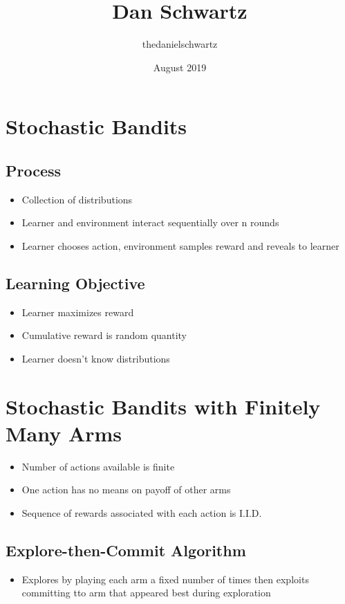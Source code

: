 \documentclass{article}
\title{Dan Schwartz}
\author{thedanielschwartz }
\date{August 2019}
\begin{document}
\maketitle

\section{Stochastic Bandits}
\subsection{Process}
\begin{itemize}
	\item Collection of distributions
	\item Learner and environment interact sequentially over n rounds
	\item Learner chooses action, environment samples reward and reveals to learner
\end{itemize}
\subsection{Learning Objective}
\begin{itemize}
	\item Learner maximizes reward
	\item Cumulative reward is random quantity
	\item Learner doesn't know distributions
\end{itemize}

\section{Stochastic Bandits with Finitely Many Arms}
\begin{itemize}
	\item Number of actions available is finite
	\item One action has no means on payoff of other arms
	\item Sequence of rewards associated with each action is I.I.D.
\end{itemize}
\subsection{Explore-then-Commit Algorithm}
\begin{itemize}
	\item Explores by playing each arm a fixed number of times then exploits committing tto arm that appeared best during exploration
\end{itemize}
\end{document}
